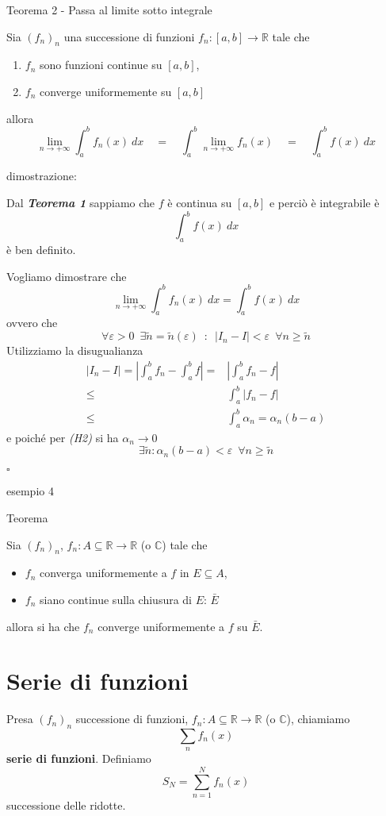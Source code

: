 \documentclass[x11names]{article}
\newcommand*{\QEDB}{\null\nobreak\hfill\ensuremath{\square}}%
\newcommand{\esempio}[2]{
	\begin{es}{esempio #1}
		#2
	\end{es}
}
\newcommand{\teorema}[2]{
	\begin{center}
		\fboxsep11pt
		\colorbox{myred}{\begin{minipage}{5.75in}
				\begin{redes}{#1}
					#2
				\end{redes}
		\end{minipage}}
	\end{center}
}
\newcommand{\dimostrazione}[2]{
	\begin{dym}{dimostrazione: #1}
		#2
		\QEDB
	\end{dym}
}
\begin{document}
\teorema{Teorema 2 - Passa al limite sotto integrale}{
Sia \((f_{n})_{n}\) una successione di funzioni \(f_{n}:[a,b]\to \mathbb{R}\) tale che
\begin{enumerate}[start=1,label={(\itshape H\arabic*)}]
	\item \(f_{n}\) sono funzioni continue su \([a,b]\),
	\item \(f_{n}\) converge uniformemente su \([a,b]\)
\end{enumerate}
allora 
\[ 
\lim_{n\to+\infty} \int_{a}^{b}f_{n}(x) \: dx \quad = \quad \int_{a}^{b}\lim_{n\to+\infty} f_{n}(x) \quad = \quad \int_{a}^{b}f(x) \: dx
\]
}
\dimostrazione{}{
Dal \textit{\textbf{Teorema 1}} sappiamo che \(f\) è continua su \([a,b]\) e perciò è integrabile è 
\[ 
\int_{a}^{b}f(x)\: dx
\]
è ben definito.

Vogliamo dimostrare che
\[ 
\lim_{n\to+\infty}\int_{a}^{b}f_{n}(x)\: dx = \int_{a}^{b}f(x)\: dx 
\]
ovvero che 
\[ 
\forall \varepsilon > 0 \;\ \exists\tilde{n} = \tilde{n}(\varepsilon) \;\ : \;\ |I_{n} - I| < \varepsilon \;\ \forall n \geq \tilde{n}
\]
Utilizziamo la disugualianza
\begin{align*}
	|I_{n} - I|  = \left|\int_{a}^{b}f_{n} - \int_{a}^{b}f\right| =& \left|\int_{a}^{b}f_{n} - f\right| \\
    \leq & \int_{a}^{b}|f_{n} - f | \\
	\leq & \int_{a}^{b} \alpha_{n} = \alpha_{n}(b-a)
\end{align*}
e poiché per \textit{(H2)} si ha \(\alpha_{n} \to 0\) 
\[ 
\exists\tilde{n} : \alpha_{n}(b-a) < \varepsilon \;\ \forall n \geq \tilde{n}
\]
}

\esempio{4}{}

\teorema{Teorema}{
Sia \((f_{n})_{n}\), \(f_{n}:A\subseteq \mathbb{R}\to \mathbb{R}\) (o \(\mathbb{C}\)) tale che 
\begin{itemize}
	\item \(f_{n}\) converga uniformemente a \(f\) in \(E \subseteq A\),
	\item \(f_{n}\) siano continue sulla chiusura di \(E\): \(\bar{E}\)
\end{itemize}
allora si ha che \(f_{n}\) converge uniformemente a \(f\) su \(\bar{E}\).
}


\section{Serie di funzioni}
Presa \((f_{n})_{n}\) successione di funzioni, \(f_{n}:A\subseteq \mathbb{R} \to \mathbb{R}\) (o \(\mathbb{C}\)), chiamiamo 
\[ 
\sum_n f_{n}(x)
\]
\textbf{serie di funzioni}. Definiamo
\[ 
S_{N} = \sum_{n=1}^N f_{n}(x)
\]
successione delle ridotte.
\end{document}
